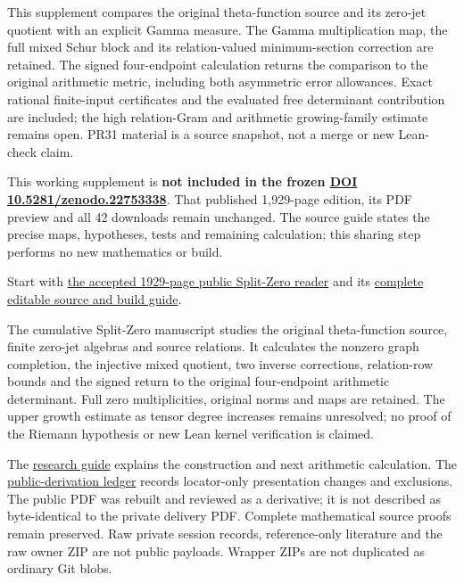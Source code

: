 \documentclass[
]{article}
\begin{document}
This supplement compares the original theta-function source and its
zero-jet quotient with an explicit Gamma measure. The Gamma
multiplication map, the full mixed Schur block and its relation-valued
minimum-section correction are retained. The signed four-endpoint
calculation returns the comparison to the original arithmetic metric,
including both asymmetric error allowances. Exact rational finite-input
certificates and the evaluated free determinant contribution are
included; the high relation-Gram and arithmetic growing-family estimate
remains open. PR31 material is a source snapshot, not a merge or new
Lean-check claim.

This working supplement is \textbf{not included in the frozen
\href{https://doi.org/10.5281/zenodo.22753338}{DOI
10.5281/zenodo.22753338}}. That published 1,929-page edition, its PDF
preview and all 42 downloads remain unchanged. The source guide states
the precise maps, hypotheses, tests and remaining calculation; this
sharing step performs no new mathematics or build.

Start with
\href{https://zenodo.org/api/records/22753338/files/41-splitzero-cumulative-graph-public-reader.pdf/content}{the
accepted 1929-page public Split-Zero reader} and its
\href{workbenches/splitzero-tandem/continuations/20260914-cumulative-graph/README.md}{complete
editable source and build guide}.

The cumulative Split-Zero manuscript studies the original theta-function
source, finite zero-jet algebras and source relations. It calculates the
nonzero graph completion, the injective mixed quotient, two inverse
corrections, relation-row bounds and the signed return to the original
four-endpoint arithmetic determinant. Full zero multiplicities, original
norms and maps are retained. The upper growth estimate as tensor degree
increases remains unresolved; no proof of the Riemann hypothesis or new
Lean kernel verification is claimed.

The \href{CURRENT_RESEARCH.md}{research guide} explains the construction
and next arithmetic calculation. The
\href{workbenches/splitzero-tandem/continuations/20260914-cumulative-graph/PUBLIC_DERIVATION.md}{public-derivation
ledger} records locator-only presentation changes and exclusions. The
public PDF was rebuilt and reviewed as a derivative; it is not described
as byte-identical to the private delivery PDF. Complete mathematical
source proofs remain preserved. Raw private session records,
reference-only literature and the raw owner ZIP are not public payloads.
Wrapper ZIPs are not duplicated as ordinary Git blobs.
\end{document}

